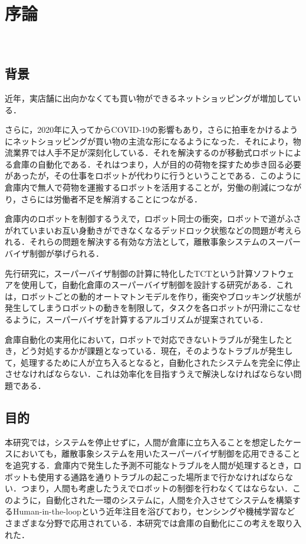\chapter{序論}\label{chap:intro}
 \setcounter{page}{1}
 
\section{背景}
近年，実店舗に出向かなくても買い物ができるネットショッピングが増加している．

さらに，2020年に入ってからCOVID-19の影響もあり，さらに拍車をかけるようにネットショッピングが買い物の主流な形になるようになった．それにより，物流業界では人手不足が深刻化している．それを解決するのが移動式ロボットによる倉庫の自動化である．それはつまり，人が目的の荷物を探すため歩き回る必要があったが，その仕事をロボットが代わりに行うということである．このように倉庫内で無人で荷物を運搬するロボットを活用することが，労働の削減につながり，さらには労働者不足を解消することにつながる．

倉庫内のロボットを制御するうえで，ロボット同士の衝突，ロボットで道がふさがれていまいお互い身動きができなくなるデッドロック状態などの問題が考えられる．それらの問題を解決する有効な方法として，離散事象システムのスーパーバイザ制御が挙げられる\cite{Supervisory_Control}\cite{Supervisory_Control_2}．

先行研究に，スーパーバイザ制御の計算に特化したTCTという計算ソフトウェアを使用して，自動化倉庫のスーパーバイザ制御を設計する研究がある\cite{Pre_research}．これは，ロボットごとの動的オートマトンモデルを作り，衝突やブロッキング状態が発生してしまうロボットの動きを制限して，タスクを各ロボットが円滑にこなせるように，スーパーバイザを計算するアルゴリズムが提案されている．

倉庫自動化の実用化において，ロボットで対応できないトラブルが発生したとき，どう対処するかが課題となっている．現在，そのようなトラブルが発生して，処理するために人が立ち入るとなると，自動化されたシステムを完全に停止させなければならない．これは効率化を目指すうえで解決しなければならない問題である．

\section{目的}
本研究では，システムを停止せずに，人間が倉庫に立ち入ることを想定したケースにおいても，離散事象システムを用いたスーパーバイザ制御を応用できることを追究する．倉庫内で発生した予測不可能なトラブルを人間が処理するとき，ロボットも使用する通路を通りトラブルの起こった場所まで行かなければならない．つまり，人間も考慮したうえでロボットの制御を行わなくてはならない．このように，自動化された一環のシステムに，人間を介入させてシステムを構築するHuman-in-the-loopという近年注目を浴びており，センシングや機械学習などさまざまな分野で応用されている\cite{HITLref_1}\cite{HITLref_2}\cite{HITLref_3}\cite{HITLref_4}．本研究では倉庫の自動化にこの考えを取り入れた．

